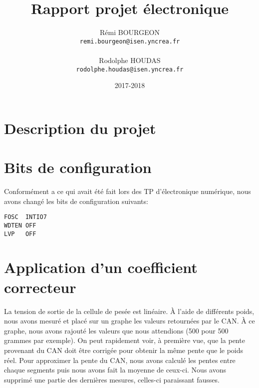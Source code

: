 \documentclass[a4paper,11pt,titlepage]{article}
\title{Rapport projet électronique}
\author{Rémi BOURGEON\\
\texttt{remi.bourgeon@isen.yncrea.fr}\\\\
Rodolphe HOUDAS\\
\texttt{rodolphe.houdas@isen.yncrea.fr}}
\date{2017-2018}
\begin{document}
\maketitle
\tableofcontents
\newpage


\section{Description du projet}

\section{Bits de configuration}

Conformément a ce qui avait été fait lors des TP d'électronique numérique, nous avons changé les bits de configuration suivants:\\


\begin{lstlisting}
FOSC  INTIO7
WDTEN OFF
LVP   OFF
\end{lstlisting}

\section{Application d'un coefficient correcteur}

La tension de sortie de la cellule de pesée est linéaire. À l'aide de différents poids, nous avons mesuré et placé sur un graphe les valeurs retournées par le CAN. À ce graphe, nous avons rajouté les valeurs que nous attendions (500 pour 500 grammes par exemple). On peut rapidement voir, à première vue, que la pente provenant du CAN doit être corrigée pour obtenir la même pente que le poids réel. Pour approximer la pente du CAN, nous avons calculé les pentes entre chaque segments puis nous avons fait la moyenne de ceux-ci. Nous avons supprimé une partie des dernières mesures, celles-ci paraissant fausses.\\

\end{document}
